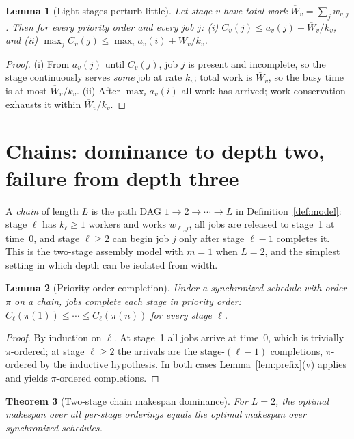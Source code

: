 \documentclass[sn-mathphys,NameDate]{sn-jnl}
\theoremstyle{thmstyleone}
\newtheorem{theorem}{Theorem}
\newtheorem{lemma}[theorem]{Lemma}
\theoremstyle{thmstylethree}
\theoremstyle{thmstyletwo}
\begin{document}
\begin{lemma}[Light stages perturb little]
\label{lem:light}
Let stage $v$ have total work
$\overline{W}_v = \sum_j w_{v,j}$. Then for every priority
order and every job $j$:
\textup{(i)} $C_v(j) \leq a_v(j) + \overline{W}_v / k_v$, and
\textup{(ii)} $\max_j C_v(j) \leq \max_i a_v(i) +
\overline{W}_v / k_v$.
\end{lemma}

\begin{proof}
(i) From $a_v(j)$ until $C_v(j)$, job $j$ is present and
incomplete, so the stage continuously serves \emph{some} job
at rate $k_v$; total work is $\overline{W}_v$, so the busy
time is at most $\overline{W}_v/k_v$. (ii) After
$\max_i a_v(i)$ all work has arrived; work conservation
exhausts it within $\overline{W}_v/k_v$.
\end{proof}

\section{Chains: dominance to depth two, failure from depth
three}
\label{sec:chains}

A \emph{chain} of length $L$ is the path DAG
$1 \to 2 \to \cdots \to L$ in
Definition~\ref{def:model}: stage $\ell$ has $k_\ell \geq 1$
workers and works $w_{\ell,j}$, all jobs are released to
stage~1 at time~0, and stage $\ell \geq 2$ can begin job $j$
only after stage $\ell - 1$ completes it. This is the
two-stage assembly model with $m = 1$ when $L = 2$, and the
simplest setting in which depth can be isolated from width.

\begin{lemma}[Priority-order completion]
\label{lem:priority-order}
Under a synchronized schedule with order $\pi$ on a chain,
jobs complete each stage in priority order:
$C_\ell(\pi(1)) \leq \cdots \leq C_\ell(\pi(n))$ for every
stage $\ell$.
\end{lemma}

\begin{proof}
By induction on $\ell$. At stage~1 all jobs arrive at time~0,
which is trivially $\pi$-ordered; at stage $\ell \geq 2$ the
arrivals are the stage-$(\ell-1)$ completions, $\pi$-ordered
by the inductive hypothesis. In both cases
Lemma~\ref{lem:prefix}(v) applies and yields $\pi$-ordered
completions.
\end{proof}

\begin{theorem}[Two-stage chain makespan dominance]
\label{thm:chain-l2}
For $L = 2$, the optimal makespan over all per-stage orderings
equals the optimal makespan over synchronized schedules.
\end{theorem}
\end{document}
